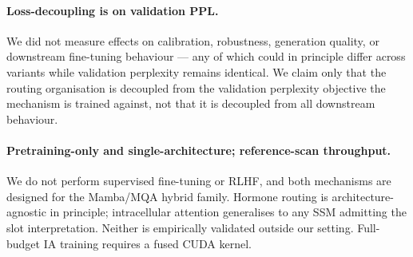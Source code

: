 \paragraph{Loss-decoupling is on validation PPL.} We did not measure effects on calibration, robustness, generation quality, or downstream fine-tuning behaviour --- any of which could in principle differ across variants while validation perplexity remains identical. We claim only that the routing organisation is decoupled from the validation perplexity objective the mechanism is trained against, not that it is decoupled from all downstream behaviour.

\paragraph{Pretraining-only and single-architecture; reference-scan throughput.} We do not perform supervised fine-tuning or RLHF, and both mechanisms are designed for the Mamba/MQA hybrid family. Hormone routing is architecture-agnostic in principle; intracellular attention generalises to any SSM admitting the slot interpretation. Neither is empirically validated outside our setting. Full-budget IA training requires a fused CUDA kernel.
